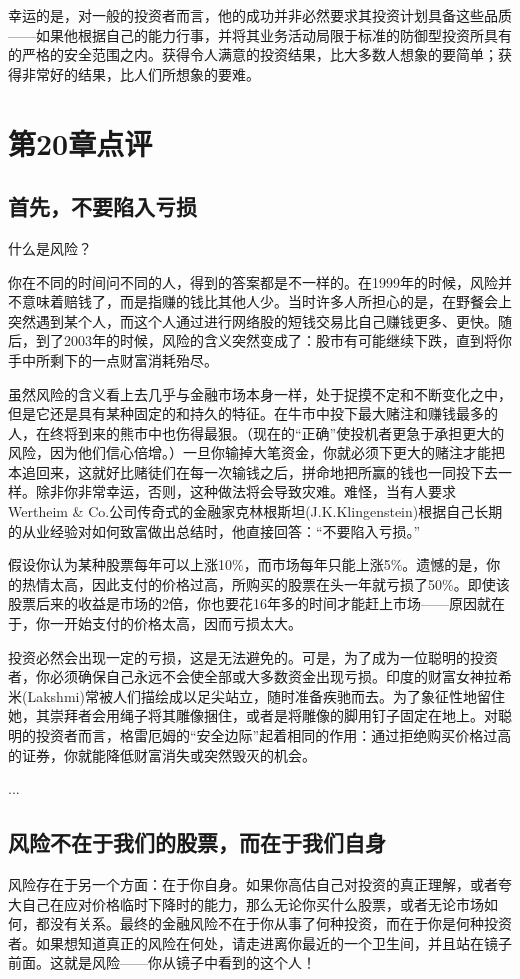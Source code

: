 \documentclass[12pt,oneside]{book}
\begin{document}
幸运的是，对一般的投资者而言，他的成功并非必然要求其投资计划具备这些品质——如果他根据自己的能力行事，并将其业务活动局限于标准的防御型投资所具有的严格的安全范围之内。获得令人满意的投资结果，比大多数人想象的要简单；获得非常好的结果，比人们所想象的要难。



\section{第20章点评}
\subsection{首先，不要陷入亏损}
什么是风险？

你在不同的时间问不同的人，得到的答案都是不一样的。在1999年的时候，风险并不意味着赔钱了，而是指赚的钱比其他人少。当时许多人所担心的是，在野餐会上突然遇到某个人，而这个人通过进行网络股的短钱交易比自己赚钱更多、更快。随后，到了2003年的时候，风险的含义突然变成了：股市有可能继续下跌，直到将你手中所剩下的一点财富消耗殆尽。

虽然风险的含义看上去几乎与金融市场本身一样，处于捉摸不定和不断变化之中，但是它还是具有某种固定的和持久的特征。在牛市中投下最大赌注和赚钱最多的人，在终将到来的熊市中也伤得最狠。（现在的“正确”使投机者更急于承担更大的风险，因为他们信心倍增。）一旦你输掉大笔资金，你就必须下更大的赌注才能把本追回来，这就好比赌徒们在每一次输钱之后，拼命地把所赢的钱也一同投下去一样。除非你非常幸运，否则，这种做法将会导致灾难。难怪，当有人要求Wertheim \& Co.公司传奇式的金融家克林根斯坦(J.K.Klingenstein)根据自己长期的从业经验对如何致富做出总结时，他直接回答：“不要陷入亏损。”

假设你认为某种股票每年可以上涨10\%，而市场每年只能上涨5\%。遗憾的是，你的热情太高，因此支付的价格过高，所购买的股票在头一年就亏损了50\%。即使该股票后来的收益是市场的2倍，你也要花16年多的时间才能赶上市场——原因就在于，你一开始支付的价格太高，因而亏损太大。

投资必然会出现一定的亏损，这是无法避免的。可是，为了成为一位聪明的投资者，你必须确保自己永远不会使全部或大多数资金出现亏损。印度的财富女神拉希米(Lakshmi)常被人们描绘成以足尖站立，随时准备疾驰而去。为了象征性地留住她，其崇拜者会用绳子将其雕像捆住，或者是将雕像的脚用钉子固定在地上。对聪明的投资者而言，格雷厄姆的“安全边际”起着相同的作用：通过拒绝购买价格过高的证券，你就能降低财富消失或突然毁灭的机会。

...

\subsection{风险不在于我们的股票，而在于我们自身}
风险存在于另一个方面：在于你自身。如果你高估自己对投资的真正理解，或者夸大自己在应对价格临时下降时的能力，那么无论你买什么股票，或者无论市场如何，都没有关系。最终的金融风险不在于你从事了何种投资，而在于你是何种投资者。如果想知道真正的风险在何处，请走进离你最近的一个卫生间，并且站在镜子前面。这就是风险——你从镜子中看到的这个人！
\end{document}
